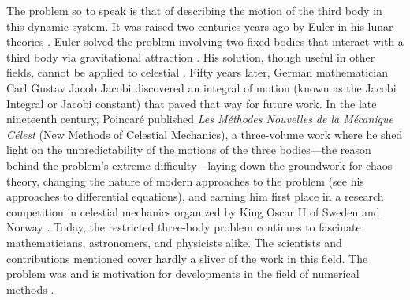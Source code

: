 \documentclass[linenumbers,RNAAS,trackchanges]{aastex631}
\begin{document}
The problem so to speak is that of describing the motion of the third body in this dynamic system. It was raised two centuries years ago by Euler in his lunar theories \cite[7]{szebehely2012theory}. Euler solved the problem involving two fixed bodies that interact with a third body via gravitational attraction \cite[5]{szebehely2012theory}. His solution, though useful in other fields, cannot be applied to celestial \cite[5]{szebehely2012theory}. Fifty years later, German mathematician Carl Gustav Jacob Jacobi discovered an integral of motion (known as the Jacobi Integral or Jacobi constant) that paved that way for future work. In the late nineteenth century, Poincaré published \textit{Les Méthodes Nouvelles de la Mécanique Célest} (New Methods of Celestial Mechanics), a three-volume work where he shed light on the unpredictability of the motions of the three bodies---the reason behind the problem's extreme difficulty---laying down the groundwork for chaos theory, changing the nature of modern approaches to the problem (see his approaches to differential equations), and earning him first place in a research competition in celestial mechanics organized by King Oscar II of Sweden and Norway \cite[2-4]{Musielak_Quarles_2015}. Today, the restricted three-body problem continues to fascinate mathematicians, astronomers, and physicists alike. The scientists and contributions mentioned cover hardly a sliver of the work in this field. The problem was and is motivation for developments in the field of numerical methods \cite[139]{hawking}.
\end{document}
